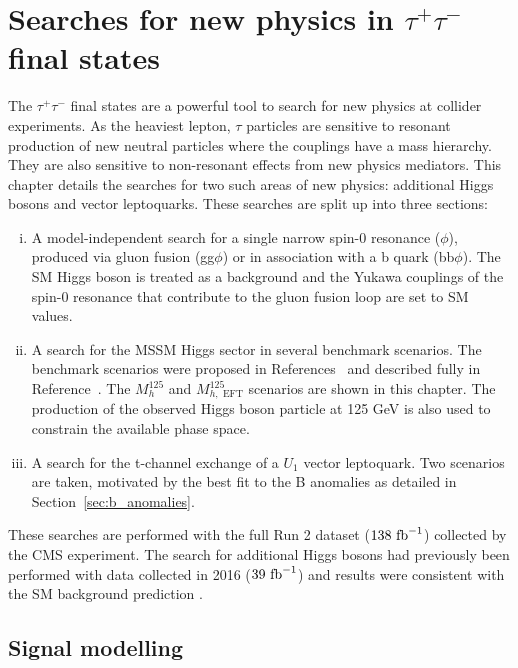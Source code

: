 \chapter{\texorpdfstring{Searches for new physics in $\tau^+\tau^-$ final states}{Search for new physics in tautau final states}}
\label{sec:bsm_H_to_tau_tau_analysis}
 
The $\tau^+\tau^-$ final states are a powerful tool to search for new physics at collider experiments. 
As the heaviest lepton, $\tau$ particles are sensitive to resonant production of new neutral particles where the couplings have a mass hierarchy.
They are also sensitive to non-resonant effects from new physics mediators. 
This chapter details the searches for two such areas of new physics: additional Higgs bosons and vector leptoquarks.
These searches are split up into three sections: 
\begin{enumerate}[i)]
  \item A model-independent search for a single narrow spin-0 resonance ($\phi$), produced via gluon fusion (gg$\phi$) or in association with a b quark (bb$\phi$). The \ac{SM} Higgs boson is treated as a background and the Yukawa couplings of the spin-0 resonance that contribute to the gluon fusion loop are set to \ac{SM} values.
   \item A search for the \ac{MSSM} Higgs sector in several benchmark scenarios. The benchmark scenarios were proposed in References~\cite{Bahl:2018zmf,Bahl:2020kwe,Bahl:2019ago} and described fully in Reference~\cite{Bagnaschi:2791954}. The $M_{h}^{125}$ and $M_{h,\text{ EFT}}^{125}$ scenarios are shown in this chapter. The production of the observed Higgs boson particle at 125 GeV is also used to constrain the available phase space.
  \item A search for the t-channel exchange of a $U_{1}$ vector leptoquark. Two scenarios are taken, motivated by the best fit to the B anomalies as detailed in Section~\ref{sec:b_anomalies}.
\end{enumerate}

These searches are performed with the full Run 2 dataset ($138 \text{ fb}^{-1}$) collected by the \ac{CMS} experiment. 
The search for additional Higgs bosons had previously been performed with data collected in 2016 ($39 \text{ fb}^{-1}$) and results were consistent with the \ac{SM} background prediction \cite{CMS_MSSM_Tau_2018}.
 
\section{Signal modelling} 
 
